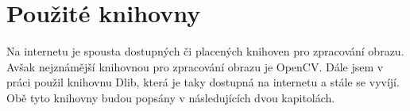 \section{Použité knihovny}
Na internetu je spousta dostupných či placených knihoven pro zpracování obrazu. Avšak nejznámější knihovnou pro zpracování obrazu je OpenCV. Dále jsem v práci použil knihovnu Dlib, která je taky dostupná na internetu a stále se vyvíjí. Obě tyto knihovny budou popsány v následujících dvou kapitolách.